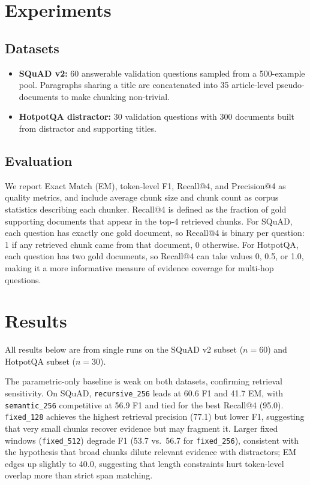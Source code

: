 \documentclass[11pt]{article}
\begin{document}
\section{Experiments}

\subsection{Datasets}

\begin{itemize}
  \item \textbf{SQuAD v2:} 60 answerable validation questions sampled from a
    500-example pool. Paragraphs sharing a title are concatenated into 35 article-level
    pseudo-documents to make chunking non-trivial.
  \item \textbf{HotpotQA distractor:} 30 validation questions with 300 documents built
    from distractor and supporting titles.
\end{itemize}


\subsection{Evaluation}

We report Exact Match (EM), token-level F1, Recall@4, and Precision@4 as quality metrics,
and include average chunk size and chunk count as corpus statistics describing each chunker. Recall@4 is defined as the fraction of gold supporting documents that
appear in the top-4 retrieved chunks. For SQuAD, each question has exactly one gold
document, so Recall@4 is binary per question: 1 if any retrieved chunk came from that
document, 0 otherwise. For HotpotQA, each question has two gold documents, so
Recall@4 can take values 0, 0.5, or 1.0, making it a more informative measure of
evidence coverage for multi-hop questions.

\section{Results}

All results below are from single runs on the SQuAD v2 subset ($n=60$) and HotpotQA subset ($n=30$).

The parametric-only baseline is weak on both datasets, confirming retrieval
sensitivity. On SQuAD, \texttt{recursive\_256} leads at 60.6 F1 and 41.7 EM, with
\texttt{semantic\_256} competitive at 56.9 F1 and tied for the best Recall@4 (95.0).
\texttt{fixed\_128} achieves the highest retrieval precision (77.1) but lower F1,
suggesting that very small chunks recover evidence but may fragment it. Larger fixed
windows (\texttt{fixed\_512}) degrade F1 (53.7 vs.\ 56.7 for \texttt{fixed\_256}),
consistent with the hypothesis that broad chunks dilute relevant evidence with distractors;
EM edges up slightly to 40.0, suggesting that length constraints hurt token-level overlap
more than strict span matching.
\end{document}
